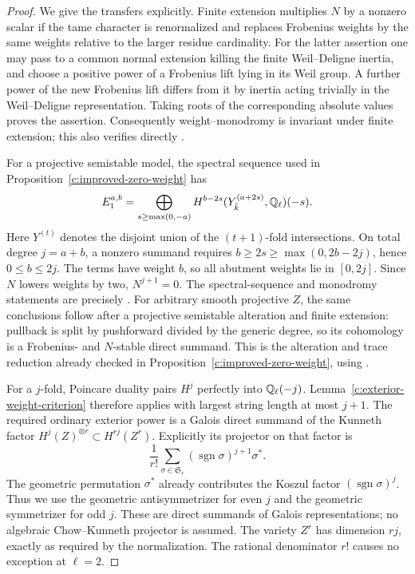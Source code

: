 \begin{proof}
We give the transfers explicitly.  Finite extension multiplies
$N$ by a nonzero scalar if the tame character is renormalized
and replaces Frobenius weights by the same weights relative to
the larger residue cardinality.  For the latter assertion one
may pass to a common normal extension killing the finite
Weil--Deligne inertia, and choose a positive power of a
Frobenius lift lying in its Weil group.  A further power of the
new Frobenius lift differs from it by inertia acting trivially
in the Weil--Deligne representation.  Taking roots of the
corresponding absolute values proves the assertion.
Consequently weight--monodromy is invariant under finite
extension; this also verifies directly
\citet[Lemma~1.4(2)]{c_tayloryoshida2007}.

For a projective semistable model, the spectral sequence used
in Proposition~\ref{c:improved-zero-weight} has
\[
 E_1^{a,b}=
 \bigoplus_{s\geq\max(0,-a)}
 H^{b-2s}(Y^{(a+2s)}_{\bar k},\mathbb Q_\ell)(-s).
\]
Here $Y^{(t)}$ denotes the disjoint union of the $(t+1)$-fold
intersections.  On total degree $j=a+b$, a nonzero summand
requires
$b\geq2s\geq\max(0,2b-2j)$, hence $0\leq b\leq2j$.
The terms have weight $b$, so all abutment weights lie in
$[0,2j]$.  Since $N$ lowers weights by two,
$N^{j+1}=0$.  The spectral-sequence and monodromy statements
are precisely \citet[Satz~2.10 and (2.11), pp.~40--41]{c_rapoportzink1982}.
For arbitrary smooth projective $Z$, the same conclusions
follow after a projective semistable alteration and finite
extension: pullback is split by pushforward divided by the
generic degree, so its cohomology is a Frobenius- and
$N$-stable direct summand.  This is the alteration and trace
reduction already checked in Proposition~\ref{c:improved-zero-weight},
using \citet[Theorem~6.5, pp.~83--86]{c_dejong1996}.

For a $j$-fold, Poincare duality pairs $H^j$ perfectly into
$\mathbb Q_\ell(-j)$.  Lemma~\ref{c:exterior-weight-criterion}
therefore applies with largest string length at most $j+1$.
The required ordinary exterior power is a Galois direct
summand of the Kunneth factor
$H^j(Z)^{\otimes r}\subset H^{rj}(Z^r)$.  Explicitly its
projector on that factor is
\[
 \frac1{r!}\sum_{\sigma\in\mathfrak S_r}
       (\operatorname{sgn}\sigma)^{j+1}\sigma^*.
\]
The geometric permutation $\sigma^*$ already contributes
the Koszul factor $(\operatorname{sgn}\sigma)^j$.
Thus we use the geometric antisymmetrizer for even $j$ and
the geometric symmetrizer for odd $j$.  These are direct
summands of Galois representations; no algebraic
Chow--Kunneth projector is assumed.  The variety $Z^r$ has
dimension $rj$, exactly as required by the normalization.
The rational denominator $r!$ causes no exception at $\ell=2$.


\end{proof}
